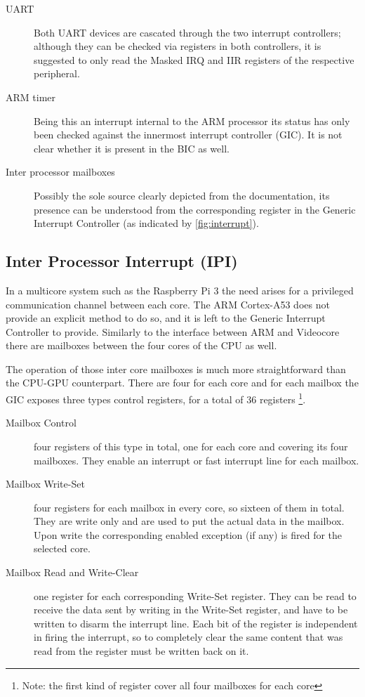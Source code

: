 \documentclass[12pt,a4paper,openright,twoside]{report}
\begin{document}
\begin{description}
    \item[UART] Both UART devices are cascated through the two interrupt controllers;
        although they can be checked via registers in both controllers, it is suggested
        to only read the Masked IRQ and IIR registers of the respective peripheral.
    \item[ARM timer] Being this an interrupt internal to the ARM processor its
        status has only been checked against the innermost interrupt controller (GIC).
        It is not clear whether it is present in the BIC as well.
    \item[Inter processor mailboxes] Possibly the sole source clearly
        depicted from the documentation, its presence can be understood from the 
        corresponding register in the Generic Interrupt Controller (as indicated
        by \ref{fig:interrupt}).
\end{description}

\subsection{Inter Processor Interrupt (IPI)}
In a multicore system such as the Raspberry Pi 3 the need arises for a privileged
communication channel between each core. The ARM Cortex-A53 does not provide an 
explicit method to do so, and it is left to the Generic Interrupt Controller to 
provide.
Similarly to the interface between ARM and Videocore there are mailboxes between
the four cores of the CPU as well.

The operation of those inter core mailboxes is much more straightforward than the
CPU-GPU counterpart. There are four for each core and for each mailbox the GIC
exposes three types control registers, for a total of 36 registers 
\footnote{Note: the first kind of register cover all four mailboxes for each core}.
\begin{description}
    \item[Mailbox Control] four registers of this type in total, one for each core
        and covering its four mailboxes. They enable an interrupt or fast interrupt
        line for each mailbox.
    \item[Mailbox Write-Set] four registers for each mailbox in every core, so 
        sixteen of them in total. They are write only and are used to put the
        actual data in the mailbox. Upon write the corresponding enabled exception
        (if any) is fired for the selected core.
    \item[Mailbox Read and Write-Clear] one register for each corresponding
        Write-Set register. They can be read to receive the data sent by writing
        in the Write-Set register, and have to be written to disarm the interrupt
        line. Each bit of the register is independent in firing the interrupt, so 
        to completely clear the same content that was read from the register must
        be written back on it.
\end{description}
\end{document}
